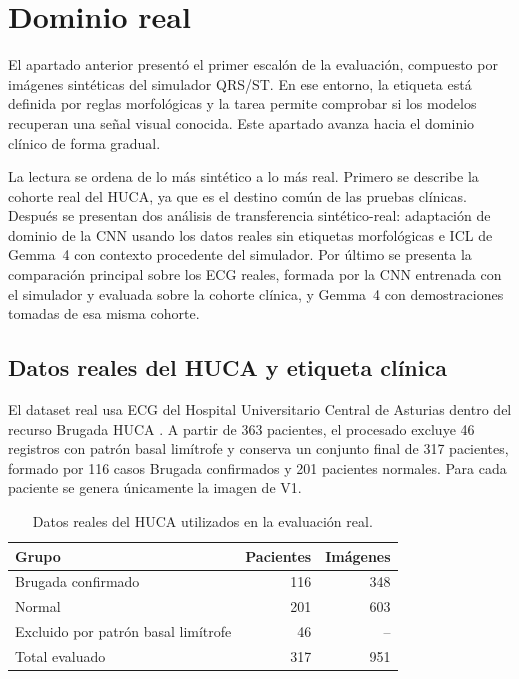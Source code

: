 \section{Dominio real}
\label{chap:comparacion_real}

El apartado anterior presentó el primer escalón de la evaluación, compuesto por imágenes sintéticas del simulador QRS/ST. En ese entorno, la etiqueta está definida por reglas morfológicas y la tarea permite comprobar si los modelos recuperan una señal visual conocida. Este apartado avanza hacia el dominio clínico de forma gradual.

La lectura se ordena de lo más sintético a lo más real. Primero se describe la cohorte real del HUCA, ya que es el destino común de las pruebas clínicas. Después se presentan dos análisis de transferencia sintético-real: adaptación de dominio de la CNN usando los datos reales sin etiquetas morfológicas e ICL de Gemma~4 con contexto procedente del simulador. Por último se presenta la comparación principal sobre los ECG reales, formada por la CNN entrenada con el simulador y evaluada sobre la cohorte clínica, y Gemma~4 con demostraciones tomadas de esa misma cohorte.

\subsection{Datos reales del HUCA y etiqueta clínica}

El dataset real usa ECG del Hospital Universitario Central de Asturias dentro del recurso Brugada HUCA \cite{costacortez2026brugada}. A partir de 363 pacientes, el procesado excluye 46 registros con patrón basal limítrofe y conserva un conjunto final de 317 pacientes, formado por 116 casos Brugada confirmados y 201 pacientes normales. Para cada paciente se genera únicamente la imagen de V1.

\begin{table}[H]
  \centering
  \begin{tabular}{lrr}
    \toprule
    Grupo & Pacientes & Imágenes \\
    \midrule
    Brugada confirmado & 116 & 348 \\
    Normal & 201 & 603 \\
    Excluido por patrón basal limítrofe & 46 & -- \\
    \midrule
    Total evaluado & 317 & 951 \\
    \bottomrule
  \end{tabular}
  \caption{Datos reales del HUCA utilizados en la evaluación real.}
  \label{tab:huca_datos_finales}
\end{table}

